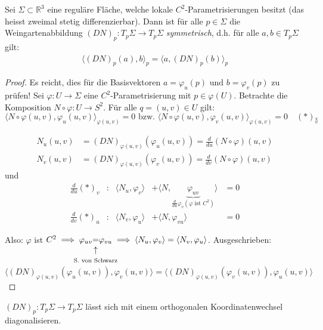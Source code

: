 \documentclass[../main.tex]{subfiles}
\begin{document}
\begin{proposition}
    Sei $\Sigma \subset \mathbb{R}^{3}$ eine reguläre Fläche, welche lokale $C^{2}$-Parametrisierungen besitzt (das heisst zweimal stetig differenzierbar). 
    Dann ist für alle $p \in \Sigma$ die Weingartenabbildung $(DN)_p:T_p\Sigma \to T_p\Sigma$ \emph{symmetrisch}, d.h. für alle $a,b \in T_p\Sigma$ gilt:
    \begin{align*}
        \langle (DN)_{p}(a), b\rangle_{p} = \langle a, (DN)_{p}(b)\rangle_{p}
    \end{align*}
\end{proposition}
\begin{proof}
    Es reicht, dies für die Basisvektoren $a = \varphi_{u}(p) \text{ und } b = \varphi_{v}(p)$ zu prüfen!
    Sei $\varphi : U \to \Sigma$ eine $C^{2}$-Parametrisierung mit $p\in\varphi(U)$.
    Betrachte die Komposition $N \circ \varphi : U \to S^{2}$.
    Für alle $q = (u,v)\in U$ gilt: $$\langle N\circ \varphi(u,v), \varphi_{u}(u,v)\rangle_{\varphi(u,v)}=0 \text{ bzw. } \langle N\circ \varphi(u,v), \varphi_{v}(u,v)\rangle_{\varphi(u,v)}=0 \quad (*)_{\overset{u}{v}}$$
    \begin{figure}[htb]
        \centering
        \def\svgwidth{10em}
        
    \end{figure}
    \begin{notation}
        \begin{align*}
            N_{u}(u,v) &= (DN)_{\varphi(u,v)}(\varphi_{u}(u,v)) = \frac{d}{du}(N\circ\varphi)(u,v) \\
            N_{v}(u,v) &= (DN)_{\varphi(u,v)}(\varphi_{v}(u,v)) = \frac{d}{dv}(N\circ\varphi)(u,v) 
        \end{align*}
        und
        \begin{align*}
            \frac{d}{du}(*)_{v} &:  &\langle N_{u}, \varphi_{v} \rangle &+  \langle N, \underbrace{\varphi_{uv}}_{\frac{d}{du}\varphi_{v}(\varphi \text{ ist } C^{2})}\rangle &= 0 \\
            \frac{d}{dv} (*)_{u} &:  &\langle N_{v}, \varphi_{u} \rangle &+   \langle N, \varphi_{vu} \rangle &= 0
        \end{align*}\end{notation}
        Also: $\varphi$ ist $C^{2} \implies \varphi_{uv} \vertarrowbox[1ex]{=}{S. von Schwarz} \varphi_{vu} \implies \langle N_{u}, \varphi_{v}\rangle = \langle N_{v}, \varphi_{u}\rangle$. \newline
        Ausgeschrieben:
        $$
            \langle (DN)_{\varphi(u,v)}(\varphi_{u}(u,v)), \varphi_{v}(u,v)\rangle = \langle (DN)_{\varphi(u,v)}(\varphi_{v}(u,v)), \varphi_{u}(u,v)\rangle
        $$
    \end{proof}
\begin{corollary}
    $(DN)_p:T_p\Sigma \to T_p\Sigma$ lässt sich mit einem orthogonalen Koordinatenwechsel diagonalisieren.
\end{corollary}
\end{document}
